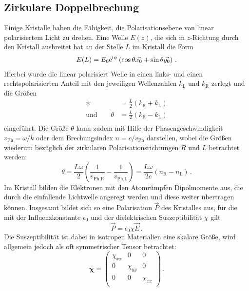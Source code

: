 \subsection{Zirkulare Doppelbrechung} %
\label{sub:doppelbrechung}
Einige Kristalle haben die Fähigkeit, die Polarisationsebene von linear
polarisiertem Licht zu drehen. Eine Welle $E(z)$, die sich in $z$-Richtung
durch den Kristall ausbreitet hat an der Stelle $L$ im Kristall die Form
\begin{equation}
    \label{eqn:energie_final}
    E(L) = E_0\mathrm{e}^{\mathrm{i}\psi}\left(
        \cos\theta\vec{x_0} + \sin\theta\vec{y_0}
    \right)\,.
\end{equation}
Hierbei wurde die linear polarisiert Welle in einen links- und einen
rechtspolarisierten Anteil mit den jeweiligen Wellenzahlen $k_\text{L}$ und
$k_\text{R}$ zerlegt und die Größen
\begin{align*}
    \psi   &= \frac{L}{2}\left(k_\text{R}+k_\text{L}\right)\\
    \text{und}\qquad\theta &= \frac{L}{2}\left(k_\text{R}-k_\text{L}\right)\\
\end{align*}
eingeführt.
Die Größe $\theta$ kann zudem mit Hilfe der Phasengeschwindigkeit
$v_\text{Ph} = \omega/k$ oder dem Brechungsindex $n=c/v_\text{Ph}$ darstellen,
wobei die Größen wiederum bezüglich der zirkularen Polarisationsrichtungen
$R$ und $L$ betrachtet werden:
\begin{equation}
    \label{eqn:theta}
    \theta = \frac{L\omega}{2}
    \left(
        \frac{1}{v_\text{Ph,R}} - \frac{1}{v_\text{Ph,L}}
    \right)
    = \frac{L\omega}{2c}\left(n_\text{R}-n_\text{L}\right)\,.
\end{equation}
Im Kristall bilden die Elektronen mit den Atomrümpfen Dipolmomente aus,
die durch die einfallende Lichtwelle angeregt werden und diese weiter
übertragen können.
Insgesamt bildet sich so eine Polarisation $\vec{P}$ des Kristalles aus,
für die mit der Influenzkonstante $\epsilon_0$ und der dielektrischen
Suszeptibilität $\chi$ gilt
\begin{equation}
    \label{eqn:polarisation}
    \vec{P} = \epsilon_0\chi\vec{E}\,.
\end{equation}
Die Suszeptibilität ist dabei in isotropen Materialien eine skalare Größe,
wird allgemein jedoch als oft symmetrischer Tensor betrachtet:
\begin{equation}
    \label{eqn:suszeptibilitaet_inaktiv}
    \mathbf{\chi} =
    \left(\begin{array}{ccc}
        \chi_{xx} & 0 & 0 \\
        0 & \chi_{yy} & 0 \\
        0 & 0 & \chi_{xx} \\
    \end{array}\right)\,.
\end{equation}
